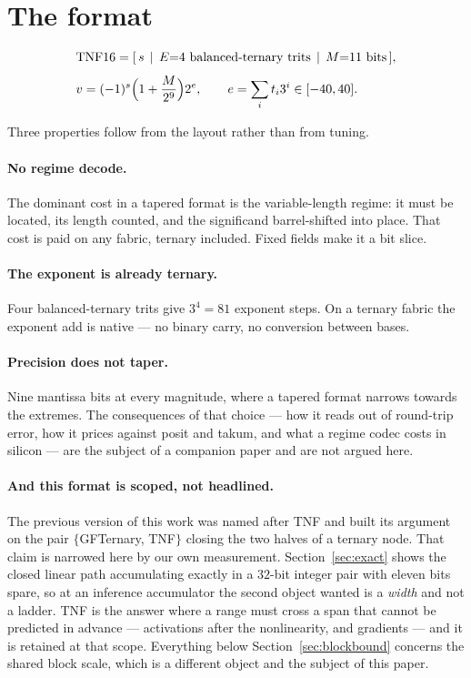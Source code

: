\documentclass[11pt]{article}
\theoremstyle{definition}
\begin{document}
\section{The format}\label{sec:format}

\begin{equation}
\begin{aligned}
&\text{TNF16}=[\,s\,\mid\,E{=}4\ \text{balanced-ternary trits}\,\mid\,M{=}11\ \text{bits}\,],\\[4pt]
&v=(-1)^{s}\Bigl(1+\frac{M}{2^{9}}\Bigr)2^{e},
\qquad e=\sum_{i} t_i 3^i \in [-40,40].
\end{aligned}
\end{equation}

Three properties follow from the layout rather than from tuning.

\paragraph{No regime decode.} The dominant cost in a tapered format is the
variable-length regime: it must be located, its length counted, and the
significand barrel-shifted into place. That cost is paid on any fabric, ternary
included. Fixed fields make it a bit slice.

\paragraph{The exponent is already ternary.} Four balanced-ternary trits give
$3^4=81$ exponent steps. On a ternary fabric the exponent add is native --- no
binary carry, no conversion between bases.

\paragraph{Precision does not taper.} Nine mantissa bits at every magnitude,
where a tapered format narrows towards the extremes. The consequences of that
choice --- how it reads out of round-trip error, how it prices against posit and
takum, and what a regime codec costs in silicon --- are the subject of a
companion paper and are not argued here.

\paragraph{And this format is scoped, not headlined.} The previous version of
this work was named after TNF and built its argument on the pair
$\{$GFTernary, TNF$\}$ closing the two halves of a ternary node. That claim is
narrowed here by our own measurement. Section~\ref{sec:exact} shows the closed
linear path accumulating exactly in a $32$-bit integer pair with eleven bits
spare, so at an inference accumulator the second object wanted is a \emph{width}
and not a ladder. TNF is the answer where a range must cross a span that cannot
be predicted in advance --- activations after the nonlinearity, and gradients ---
and it is retained at that scope. Everything below Section~\ref{sec:blockbound}
concerns the shared block scale, which is a different object and the subject of
this paper.
\end{document}
